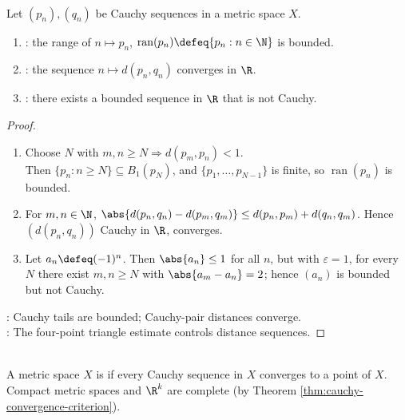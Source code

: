 \begin{proposition} \label{prop:cauchy-sequences-bounded-distance-converges} \\
Let $(p_n),(q_n)$ be Cauchy sequences in a metric space $X$.
\begin{enumerate}[label=(\roman*)]
\setlength{\itemsep}{0pt}
\item {}: the range of $n\mapsto p_n$, $\operatorname{ran}(p_n)\defeq\{p_n:n\in\N\}$ is bounded.
\item {}: the sequence $n\mapsto d(p_n,q_n)$ converges in $\R$.
\item {}: there exists a bounded sequence in $\R$ that is not Cauchy.
\end{enumerate}
\begin{proof}
\begin{enumerate}[label=(\roman*)]
\setlength{\itemsep}{0pt}
\item Choose $N$ with $m,n\geq N\Longrightarrow d(p_m,p_n)<1$.\\
Then $\{p_n:n\geq N\}\subseteq B_1(p_N)$, and $\{p_1,\ldots,p_{N-1}\}$ is finite, so $\operatorname{ran}(p_n)$ is bounded.
\item For $m,n\in\N$, $\abs{d(p_n,q_n)-d(p_m,q_m)}\leq d(p_n,p_m)+d(q_n,q_m)$. Hence $(d(p_n,q_n))$ Cauchy in $\R$, converges.
\item Let $a_n\defeq(-1)^n$. Then $\abs{a_n}\leq1$ for all $n$, but with $\varepsilon=1$, for every $N$ there exist $m,n\geq N$ with $\abs{a_m-a_n}=2$; hence $(a_n)$ is bounded but not Cauchy.
\end{enumerate}
: Cauchy tails are bounded; Cauchy-pair distances converge.\\
: The four-point triangle estimate controls distance sequences.
\end{proof}
\end{proposition}

\begin{definition} \label{def:complete-metric-space} \\
A metric space $X$ is  if every Cauchy sequence in $X$ converges to a point of $X$.\\
Compact metric spaces and $\R^k$ are complete (by Theorem \ref{thm:cauchy-convergence-criterion}).
\end{definition}

